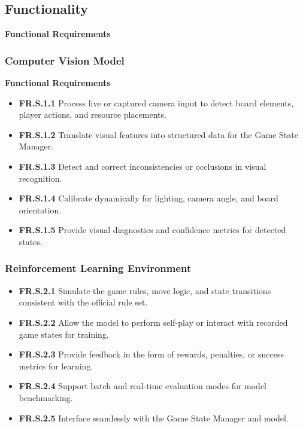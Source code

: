 \documentclass{article}
\begin{document}
\subsection{Functionality}\label{subsec:functionality}


\textbf{Functional Requirements}

\subsubsection{Computer Vision Model}

\textbf{Functional Requirements}

\begin{itemize}
  \item \label{FR.S.1.1}\textbf{FR.S.1.1} Process live or captured camera input to detect board elements, player actions, and resource placements.
  \item \label{FR.S.1.2}\textbf{FR.S.1.2} Translate visual features into structured \GameState{} data for the Game State Manager.
  \item \label{FR.S.1.3}\textbf{FR.S.1.3} Detect and correct inconsistencies or occlusions in visual recognition.
  \item \label{FR.S.1.4}\textbf{FR.S.1.4} Calibrate dynamically for lighting, camera angle, and board orientation.
  \item \label{FR.S.1.5}\textbf{FR.S.1.5} Provide visual diagnostics and confidence metrics for detected states.
\end{itemize}

\subsubsection{Reinforcement Learning Environment}

\begin{itemize}
  \item \label{FR.S.2.1}\textbf{FR.S.2.1} Simulate the game rules, move logic, and state transitions consistent with the official \emph{\Catan{}} rule set.
  \item \label{FR.S.2.2}\textbf{FR.S.2.2} Allow the \AI{} model to perform self-play or interact with recorded game states for training.
  \item \label{FR.S.2.3}\textbf{FR.S.2.3} Provide feedback in the form of rewards, penalties, or success metrics for learning.
  \item \label{FR.S.2.4}\textbf{FR.S.2.4} Support batch and real-time evaluation modes for model benchmarking.
  \item \label{FR.S.2.5}\textbf{FR.S.2.5} Interface seamlessly with the Game State Manager and \AI{} model.
\end{itemize}
\end{document}
